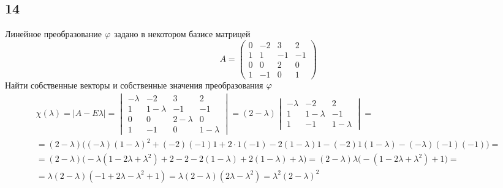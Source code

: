 \subsection{14}

Линейное преобразование $ \varphi $ задано в некотором базисе матрицей
$$ A =
\begin{pmatrix}
	0 & -2 & 3 & 2 \\
    1 & 1 & -1 & -1 \\
    0 & 0 & 2 & 0 \\
    1 & -1 & 0 & 1
\end{pmatrix} $$
Найти собственные векторы и собственные значения преобразования $ \varphi $
\begin{multline*}
    \chi(\lambda) = |A - E\lambda| =
    \begin{vmatrix}
        -\lambda & -2 & 3 & 2 \\
        1 & 1 - \lambda & -1 & -1 \\
        0 & 0 & 2 - \lambda & 0 \\
        1 & -1 & 0 & 1 - \lambda
    \end{vmatrix} = (2 - \lambda)
    \begin{vmatrix}
        -\lambda & -2 & 2 \\
        1 & 1 - \lambda & -1 \\
        1 & -1 & 1 - \lambda
    \end{vmatrix} = \\
    = (2 - \lambda) \bigg( (-\lambda)(1 - \lambda)^2 + (-2)(-1)1 + 2 \cdot 1(-1) - 2(1 - \lambda)1 - (-2)1(1 - \lambda) - (-\lambda)(-1)(-1) \bigg) = \\
    = (2 - \lambda) \bigg( -\lambda(1 - 2\lambda + \lambda^2) + 2 - 2 -2(1 - \lambda) + 2(1 - \lambda) + \lambda \bigg) = (2 - \lambda)\lambda \bigg( -(1 - 2\lambda + \lambda^2) + 1 \bigg) = \\
    = \lambda(2 - \lambda)(-1 + 2\lambda - \lambda^2 + 1) = \lambda(2 - \lambda)(2\lambda - \lambda^2) = \lambda^2(2 - \lambda)^2
\end{multline*}
